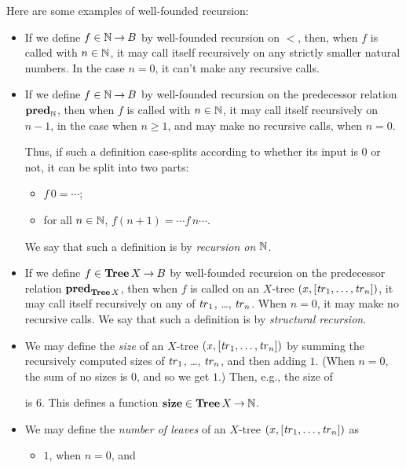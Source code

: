 Here are some examples of well-founded recursion:
\begin{itemize}
\item If we define $f\in\mathbb{N}\mathbin{\to} B$ by well-founded recursion on $<$,
  then, when $f$ is called with $n\in\mathbb{N}$, it may call itself
  recursively on any strictly smaller natural numbers.  In the case
  $n=0$, it can't make any recursive calls.

\item If we define $f\in\mathbb{N}\mathbin{\to} B$ by well-founded recursion on
  the predecessor relation $\mathrel{\mathbf{pred}}_{\mathbb{N}}$, then when $f$ is called with
  $n\in\mathbb{N}$, it may call itself recursively on $n-1$, in the
  case when $n\geq 1$, and may make no recursive calls, when $n=0$.

  Thus, if such a definition case-splits according to whether
  its input is $0$ or not, it can be split into two parts:
  \begin{itemize}
  \item $f\,0 = \cdots$;

  \item for all $n\in\mathbb{N}$, $f(n + 1) = \cdots f\,n \cdots$.
  \end{itemize}
  We say that such a definition is by \emph{recursion on} $\mathbb{N}$.

\item If we define $f\in\mathbf{Tree}\,X\mathbin{\to} B$ by well-founded recursion on
  the predecessor relation $\mathrel{\mathbf{pred}}_{\mathbf{Tree}\,X}$, then when $f$ is called
  on an $X$-tree $(x,[{\it tr}_1,\ldots,{\it tr}_n])$, it may call itself
  recursively on any of ${\it tr}_1$, \ldots, ${\it tr}_n$.  When $n=0$, it may
  make no recursive calls. We say that such a definition is by
  \emph{structural recursion}.

\item We may define the \emph{size} of an $X$-tree
  $(x,[{\it tr}_1,\ldots,{\it tr}_n])$ by summing the recursively computed sizes
  of ${\it tr}_1$, \ldots, ${\it tr}_n$, and then adding $1$. (When $n=0$, the
  sum of no sizes is $0$, and so we get $1$.) Then, e.g., the size of
\begin{center}

\end{center}
is $6$. This defines a function ${\mathrel{\mathbf{size}}}\in\mathbf{Tree}\,X\mathbin{\to}\mathbb{N}$.

\item We may define the \emph{number of leaves} of an $X$-tree
  $(x,[{\it tr}_1,\ldots,{\it tr}_n])$ as
  \begin{itemize}
  \item $1$, when $n=0$, and


\end{itemize}
\end{itemize}
